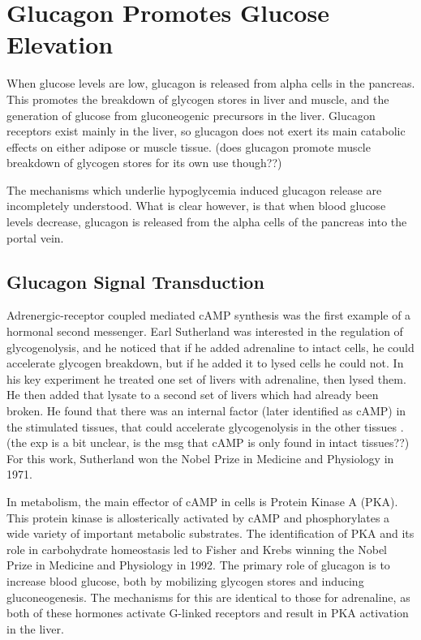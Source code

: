 \documentclass{tufte-handout}
\begin{document}
\section{Glucagon Promotes Glucose Elevation}

 When glucose levels are low, glucagon is released from alpha cells in the pancreas.  This promotes the breakdown of glycogen stores in liver and muscle, and the generation of glucose from gluconeogenic precursors in the liver.  Glucagon receptors exist mainly in the liver, so glucagon does not exert its main catabolic effects on either adipose or muscle tissue.  (does glucagon promote muscle breakdown of glycogen stores for its own use though??)

The mechanisms which underlie hypoglycemia induced glucagon release are incompletely understood.  What is clear however, is that when blood glucose levels decrease, glucagon is released from the alpha cells of the pancreas into the portal vein.

\subsection{Glucagon Signal Transduction}

Adrenergic-receptor coupled mediated cAMP synthesis was the first example of a hormonal second messenger.  Earl Sutherland was interested in the regulation of glycogenolysis, and he noticed that if he added adrenaline to intact cells, he could accelerate glycogen breakdown, but if he added it to lysed cells he could not.  In his key experiment he treated one set of livers with adrenaline, then lysed them.  He then added that lysate to a second set of livers which had already been broken.  He found that there was an internal factor (later identified as cAMP) in the stimulated tissues, that could accelerate glycogenolysis in the other tissues \citep{Rall1956}.  (the exp is a bit unclear, is the msg that cAMP is only found in intact tissues??) For this work, Sutherland won the Nobel Prize in Medicine and Physiology in 1971.

In metabolism, the main effector of cAMP in cells is Protein Kinase A (PKA).  This protein kinase is allosterically activated by cAMP and phosphorylates a wide variety of important metabolic substrates.  The identification of PKA and its role in carbohydrate homeostasis led to Fisher and Krebs winning the Nobel Prize in Medicine and Physiology in 1992.  The primary role of glucagon is to increase blood glucose, both by mobilizing glycogen stores and inducing gluconeogenesis.  The mechanisms for this are identical to those for adrenaline, as both of these hormones activate G-linked receptors  and result in PKA activation in the liver.
\end{document}
